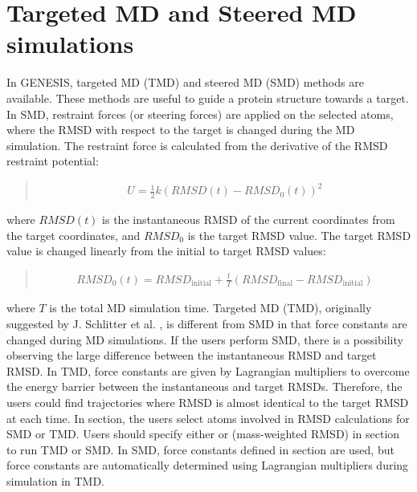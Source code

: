 \documentclass[a4paper,11pt,oneside,english]{sphinxmanual}
\begin{document}
\section{Targeted MD and Steered MD simulations}
\label{\detokenize{06_Dynamics:targeted-md-and-steered-md-simulations}}
In GENESIS, targeted MD (TMD) and steered MD (SMD) methods are available.
These methods are useful to guide a protein structure towards a target.
In SMD, restraint forces (or steering forces) are applied on the selected atoms,
where the RMSD with respect to the target is changed during the MD simulation.
The restraint force is calculated from the derivative of the RMSD restraint potential:
\begin{quote}

\vspace{-5mm}
\begin{equation*}
\begin{split}U = \frac{1}{2}k\left(RMSD(t)-RMSD_{0}(t)\right)^{2}\end{split}
\end{equation*}
\vspace{-3mm}
\end{quote}

where \(RMSD(t)\) is the instantaneous RMSD of the current coordinates
from the target coordinates, and \(RMSD_{0}\) is the target RMSD value.
The target RMSD value is changed linearly from the initial to target RMSD values:
\begin{quote}

\vspace{-5mm}
\begin{equation*}
\begin{split}RMSD_0(t) = RMSD_{\text{initial}}+\frac{t}{T}\left(RMSD_{\text{final}}-RMSD_{\text{initial}}\right)\end{split}
\end{equation*}
\vspace{-3mm}
\end{quote}

where \(T\) is the total MD simulation time. Targeted MD (TMD),
originally suggested by J. Schlitter et al. ,
is different from SMD in that force constants are changed during MD
simulations. If the users perform SMD, there is a possibility observing the
large difference between the instantaneous RMSD and target RMSD.
In TMD, force constants are given by
Lagrangian multipliers to overcome the energy barrier between the
instantaneous and target RMSDs. Therefore, the users could find
trajectories where RMSD is almost identical to the target RMSD at
each time. In \sphinxstylestrong{{[}SELECTION{]}} section, the users select atoms involved
in RMSD calculations for SMD or TMD. Users should specify either
 or  (mass-weighted RMSD) in \sphinxstylestrong{{[}RESTRAINTS{]}} section to
run TMD or SMD. In SMD, force constants defined in \sphinxstylestrong{{[}RESTRAINTS{]}}
section are used, but force constants are automatically determined using
Lagrangian multipliers during simulation in TMD.
\end{document}
